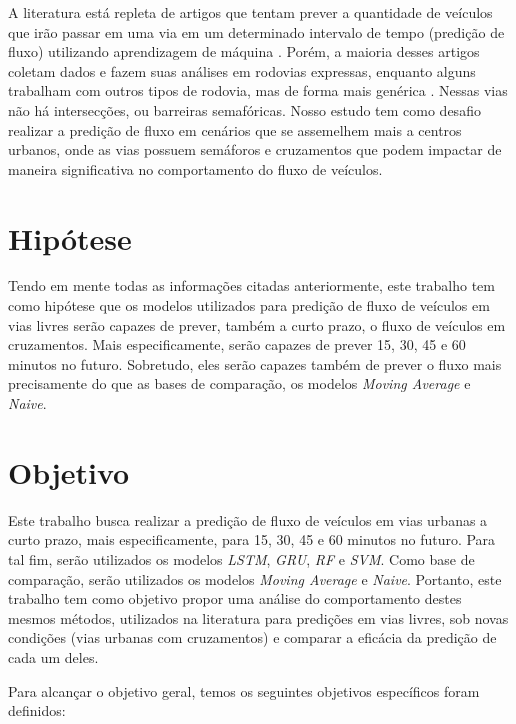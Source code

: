 A literatura está repleta de artigos que tentam prever a quantidade de veículos que irão passar em uma via em um determinado intervalo de tempo (predição de fluxo) utilizando aprendizagem de máquina \cite{doi:10.1080/01441647.2014.992496, fu2016using, hamed_prediction_1995, lv_6894591, Seoul, wang_2018, Xiaolei_2015, Zainab_2018}. Porém, a maioria desses artigos coletam dados e fazem suas análises em rodovias expressas, enquanto alguns trabalham com outros tipos de rodovia, mas de forma mais genérica \cite{Seoul}. Nessas vias não há intersecções, ou barreiras semafóricas. Nosso estudo tem como desafio realizar a predição de fluxo em cenários que se assemelhem mais a centros urbanos, onde as vias possuem semáforos e cruzamentos que podem impactar de maneira significativa no comportamento do fluxo de veículos.

\section{Hipótese}

Tendo em mente todas as informações citadas anteriormente, este trabalho tem como hipótese que os modelos utilizados para predição de fluxo de veículos em vias livres serão capazes de prever, também a curto prazo, o fluxo de veículos em cruzamentos. Mais especificamente, serão capazes de prever 15, 30, 45 e 60 minutos no futuro. Sobretudo, eles serão capazes também de prever o fluxo mais precisamente do que as bases de comparação, os modelos \textit{Moving Average} e \textit{Naive}.

\section{Objetivo}

Este trabalho busca realizar a predição de fluxo de veículos em vias urbanas a curto prazo, mais especificamente, para 15, 30, 45 e 60 minutos no futuro. Para tal fim, serão utilizados os modelos \textit{\acrfull{LSTM}}, \textit{\acrfull{GRU}}, \textit{\acrfull{RF}} e \textit{\acrfull{SVM}}. Como base de comparação, serão utilizados os modelos \textit{Moving Average} e \textit{Naive}. Portanto, este trabalho tem como objetivo propor uma análise do comportamento destes mesmos métodos, utilizados na literatura para predições em vias livres, sob novas condições (vias urbanas com cruzamentos) e comparar a eficácia da predição de cada um deles.

Para alcançar o objetivo geral, temos os seguintes objetivos específicos foram definidos:

